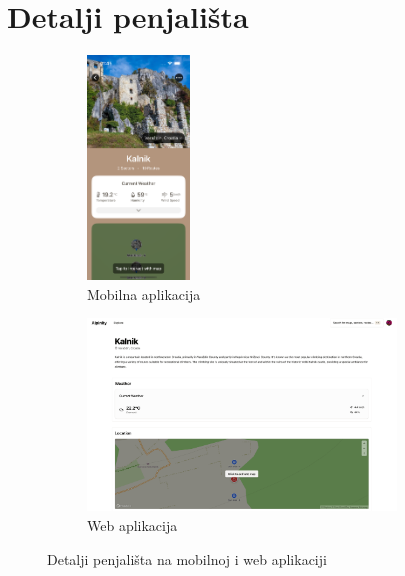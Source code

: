 \section{Detalji penjališta}

\begin{figure}[H]
    \centering
    \begin{subfigure}[b]{\textwidth}
        \centering
        \includegraphics[width=0.3\textwidth]{images/implementacija/crag-details/crag-details-top.png}
        \caption{Mobilna aplikacija}
        \label{fig:detalji_penjališta_mob}
    \end{subfigure}
    \hfill
    \begin{subfigure}[b]{\textwidth}
        \centering
        \includegraphics[width=0.9\textwidth]{images/implementacija/web/crag-details/crag-details-top.png}
        \caption{Web aplikacija}
        \label{fig:detalji_penjališta_web}
    \end{subfigure}
    \caption{Detalji penjališta na mobilnoj i web aplikaciji}
    \label{fig:detalji_penjališta_1}
\end{figure}

